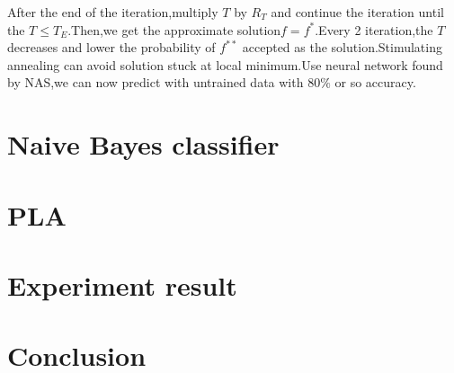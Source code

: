 \documentclass[twocolumn,10pt]{article}
\begin{document}
After the end of the iteration,multiply $T$ by $R_T$ and continue the iteration until the $T \le T_E$.Then,we get the approximate solution$f=f^*$.Every 2 iteration,the $T$ decreases and lower the probability of $f^{**}$ accepted as the solution.Stimulating annealing can avoid solution stuck at local minimum.Use neural network found by NAS,we can now predict with untrained data with $80\%$ or so accuracy.
\section{Naive Bayes classifier}

\section{PLA}

\section{Experiment result}

\section{Conclusion}



\end{document}
